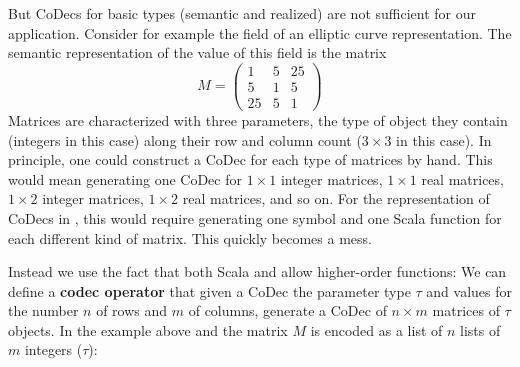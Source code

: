 But CoDecs for basic types (semantic and realized) are not sufficient for our application.
Consider for example the  field of an elliptic curve representation. 
The semantic representation of the value of this field is the matrix
\[M = \left(
    \begin{array}{ccc}
      1 & 5 & 25 \\
      5 & 1 & 5 \\
      25 & 5 & 1 \end{array} 
  \right)
\]
Matrices are characterized with three parameters, the type of object they contain (integers in this case) along their row and column count ($3 \times 3$ in this case). 
In principle, one could construct a CoDec for each type of matrices by hand. 
This would mean generating one CoDec for $1 \times 1$ integer matrices, $1 \times 1$ real matrices, $1 \times 2$ integer matrices, $1 \times 2$ real matrices, and so on. 
For the representation of CoDecs in \mmt, this would require generating one symbol and one Scala function for each different kind of matrix. 
This quickly becomes a mess.

Instead we use the fact that both Scala and \ommt allow higher-order functions: 
We can define a \textbf{codec operator} that given a CoDec the parameter type $\tau$ and values for the number $n$ of rows and $m$ of columns, generate a CoDec of $n\times m$ matrices of $\tau$ objects. 
In the example above and the matrix $M$ is encoded as a list of $n$ lists of $m$ integers ($\tau$):
\\\noindent
\inlinecode{[[1.0,5.0,25.0],[5.0,1.0,5.0],[25.0,5.0,1.0]]}

